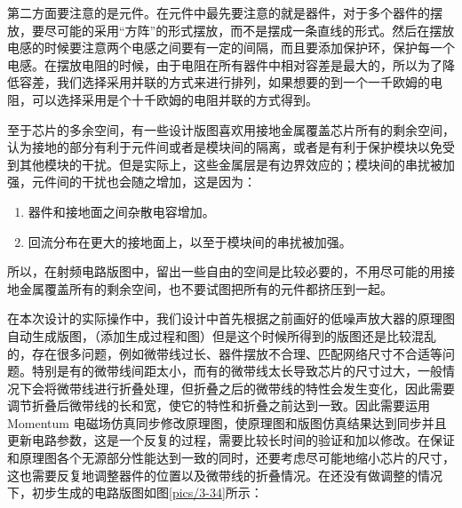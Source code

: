 第二方面要注意的是元件。在元件中最先要注意的就是器件，对于多个器件的摆放，要尽可能的采用“方阵”的形式摆放，而不是摆成一条直线的形式。然后在摆放电感的时候要注意两个电感之间要有一定的间隔，而且要添加保护环，保护每一个电感。在摆放电阻的时候，由于电阻在所有器件中相对容差是最大的，所以为了降低容差，我们选择采用并联的方式来进行排列，如果想要的到一个一千欧姆的电阻，可以选择采用是个十千欧姆的电阻并联的方式得到。

至于芯片的多余空间，有一些设计版图喜欢用接地金属覆盖芯片所有的剩余空间，认为接地的部分有利于元件间或者是模块间的隔离，或者是有利于保护模块以免受到其他模块的干扰。但是实际上，这些金属层是有边界效应的；模块间的串扰被加强，元件间的干扰也会随之增加，这是因为：
\begin{enumerate}
	\item 器件和接地面之间杂散电容增加。
	\item 回流分布在更大的接地面上，以至于模块间的串扰被加强。
\end{enumerate}

所以，在射频电路版图中，留出一些自由的空间是比较必要的，不用尽可能的用接地金属覆盖所有的剩余空间，也不要试图把所有的元件都挤压到一起。

在本次设计的实际操作中，我们设计中首先根据之前画好的低噪声放大器的原理图自动生成版图，（添加生成过程和图）但是这个时候所得到的版图还是比较混乱的，存在很多问题，例如微带线过长、器件摆放不合理、匹配网络尺寸不合适等问题。特别是有的微带线间距太小，而有的微带线太长导致芯片的尺寸过大，一般情况下会将微带线进行折叠处理，但折叠之后的微带线的特性会发生变化，因此需要调节折叠后微带线的长和宽，使它的特性和折叠之前达到一致。因此需要运用 Momentum 电磁场仿真同步修改原理图，使原理图和版图仿真结果达到同步并且更新电路参数，这是一个反复的过程，需要比较长时间的验证和加以修改。在保证和原理图各个无源部分性能达到一致的同时，还要考虑尽可能地缩小芯片的尺寸，这也需要反复地调整器件的位置以及微带线的折叠情况。在还没有做调整的情况下，初步生成的电路版图如图\ref{pics/3-34}所示：



